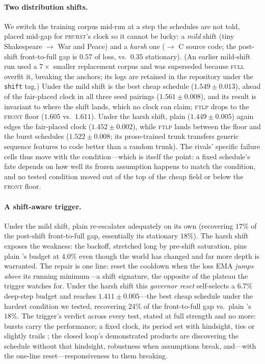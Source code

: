 \paragraph{Two distribution shifts.} We switch the
training corpus mid-run at a step the schedules are not told, placed
mid-gap for \textsc{pburst}'s clock so it cannot be lucky: a \emph{mild}
shift (tiny Shakespeare $\to$ War and Peace) and a \emph{harsh} one ($\to$
C source code; the post-shift front-to-full gap is $0.57$ of loss, vs.\
$0.35$ stationary). (An earlier mild-shift run used a $7\times$ smaller
replacement corpus and was superseded because \textsc{full} overfit it,
breaking the anchors; its logs are retained in the repository under the
\texttt{shift} tag.)
Under the mild shift \fw{} is the best cheap schedule ($1.549 \pm 0.013$),
ahead of the fair-placed clock in all three seed pairings ($1.561 \pm
0.008$), and its result is invariant to where the shift lands, which no
clock can claim; \textsc{ftlp} drops to the \textsc{front} floor ($1.605$
vs.\ $1.611$). Under the harsh shift, plain \fw{} ($1.449 \pm 0.005$)
again edges the fair-placed clock ($1.452 \pm 0.002$), while \textsc{ftlp} lands
between the floor and the burst schedules ($1.522 \pm 0.008$; its
prose-trained trunk transfers generic sequence features to code better than
a random trunk). The rivals' specific failure cells thus move with the
condition---which is itself the point: a fixed schedule's fate depends on
how well its frozen assumption happens to match the condition, and no
tested condition moved \fw{} out of the top of the cheap field or below
the \textsc{front} floor.

\paragraph{A shift-aware trigger.} Under the mild shift, plain \fw{}
re-escalates adequately on its own (recovering $17\%$ of the post-shift
front-to-full gap, essentially its stationary $18\%$). The harsh shift
exposes the weakness: the backoff, stretched long by pre-shift saturation,
pins plain \fw{}'s budget at $4.0\%$ even though the world has changed
and far more depth is warranted. The repair is one line: reset the
cooldown when the loss EMA \emph{jumps above} its running minimum---a
shift signature, the opposite of the plateau the trigger watches for.
Under the harsh shift this \emph{governor reset} self-selects a $6.7\%$
deep-step budget and reaches $1.411 \pm 0.005$---the best cheap schedule
under the hardest condition we tested, recovering $24\%$ of the
front-to-full gap vs.\ plain \fw{}'s $18\%$. The trigger's verdict across
every test, stated at full strength and no more: bursts carry the
performance; a fixed clock, its period set with hindsight, ties or
slightly trails \fw{}; the closed loop's demonstrated products are
discovering the schedule without that hindsight, robustness when
assumptions break, and---with the one-line reset---responsiveness to them
breaking.

